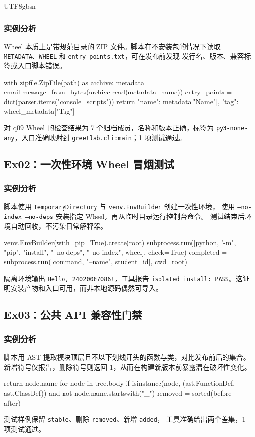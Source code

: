 \documentclass[11pt]{article}
\begin{document}
\begin{CJK*}{UTF8}{gbsn}
\subsubsection{实例分析}
Wheel 本质上是带规范目录的 ZIP 文件。脚本在不安装包的情况下读取
\texttt{METADATA}、\texttt{WHEEL} 和 \texttt{entry\_points.txt}，可在发布前发现
发行名、版本、兼容标签或入口脚本错误。
\begin{CodeBlock}
with zipfile.ZipFile(path) as archive:
    metadata = email.message_from_bytes(archive.read(metadata_name))
    entry_points = dict(parser.items("console_scripts"))
return {"name": metadata["Name"], "tag": wheel_metadata["Tag"]}
\end{CodeBlock}
\begin{resultbox}
对 q09 Wheel 的检查结果为 7 个归档成员，名称和版本正确，标签为
\texttt{py3-none-any}，入口准确映射到 \texttt{greetlab.cli:main}；1 项测试通过。
\end{resultbox}

\subsection{Ex02：一次性环境 Wheel 冒烟测试}
\subsubsection{实例分析}
脚本使用 \texttt{TemporaryDirectory} 与 \texttt{venv.EnvBuilder} 创建一次性环境，
使用 \texttt{--no-index --no-deps} 安装指定 Wheel，再从临时目录运行控制台命令。
测试结束后环境自动回收，不污染日常解释器。
\begin{CodeBlock}
venv.EnvBuilder(with_pip=True).create(root)
subprocess.run([python, "-m", "pip", "install",
                "--no-deps", "--no-index", wheel], check=True)
completed = subprocess.run([command, "--name", student_id], cwd=root)
\end{CodeBlock}
\begin{resultbox}
隔离环境输出 \texttt{Hello, 24020007086!}，工具报告
\texttt{isolated install: PASS}。这证明安装产物和入口可用，而非本地源码偶然可导入。
\end{resultbox}

\clearpage
\subsection{Ex03：公共 API 兼容性门禁}
\subsubsection{实例分析}
脚本用 AST 提取模块顶层且不以下划线开头的函数与类，对比发布前后的集合。
新增符号仅报告，删除符号则返回 1，从而在构建新版本前暴露潜在破坏性变化。
\begin{CodeBlock}
return {node.name for node in tree.body
        if isinstance(node, (ast.FunctionDef, ast.ClassDef))
        and not node.name.startswith("_")}
removed = sorted(before - after)
\end{CodeBlock}
\begin{resultbox}
测试样例保留 \texttt{stable}、删除 \texttt{removed}、新增 \texttt{added}，
工具准确给出两个差集，1 项测试通过。
\end{resultbox}


\end{CJK*}
\end{document}
